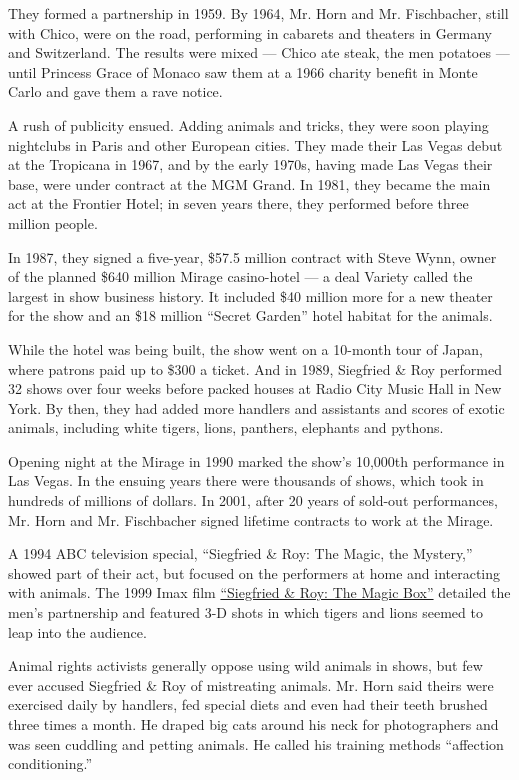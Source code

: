They formed a partnership in 1959. By 1964, Mr. Horn and Mr.
Fischbacher, still with Chico, were on the road, performing in cabarets
and theaters in Germany and Switzerland. The results were mixed ---
Chico ate steak, the men potatoes --- until Princess Grace of Monaco saw
them at a 1966 charity benefit in Monte Carlo and gave them a rave
notice.

A rush of publicity ensued. Adding animals and tricks, they were soon
playing nightclubs in Paris and other European cities. They made their
Las Vegas debut at the Tropicana in 1967, and by the early 1970s, having
made Las Vegas their base, were under contract at the MGM Grand. In
1981, they became the main act at the Frontier Hotel; in seven years
there, they performed before three million people.

In 1987, they signed a five-year, \$57.5 million contract with Steve
Wynn, owner of the planned \$640 million Mirage casino-hotel --- a deal
Variety called the largest in show business history. It included \$40
million more for a new theater for the show and an \$18 million ``Secret
Garden'' hotel habitat for the animals.

While the hotel was being built, the show went on a 10-month tour of
Japan, where patrons paid up to \$300 a ticket. And in 1989, Siegfried
\& Roy performed 32 shows over four weeks before packed houses at Radio
City Music Hall in New York. By then, they had added more handlers and
assistants and scores of exotic animals, including white tigers, lions,
panthers, elephants and pythons.

Opening night at the Mirage in 1990 marked the show's 10,000th
performance in Las Vegas. In the ensuing years there were thousands of
shows, which took in hundreds of millions of dollars. In 2001, after 20
years of sold-out performances, Mr. Horn and Mr. Fischbacher signed
lifetime contracts to work at the Mirage.

A 1994 ABC television special, ``Siegfried \& Roy: The Magic, the
Mystery,'' showed part of their act, but focused on the performers at
home and interacting with animals. The 1999 Imax film
\href{https://www.youtube.com/watch?v=hHiA1iDYkWU}{``Siegfried \& Roy:
The Magic Box''} detailed the men's partnership and featured 3-D shots
in which tigers and lions seemed to leap into the audience.

Animal rights activists generally oppose using wild animals in shows,
but few ever accused Siegfried \& Roy of mistreating animals. Mr. Horn
said theirs were exercised daily by handlers, fed special diets and even
had their teeth brushed three times a month. He draped big cats around
his neck for photographers and was seen cuddling and petting animals. He
called his training methods ``affection conditioning.''

